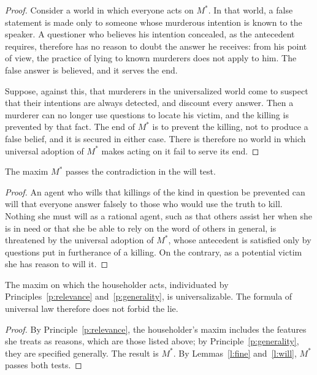 \documentclass{situationist-preprint}
\begin{document}
\begin{proof}
Consider a world in which everyone acts on $M^\ast$. In that world, a false statement is made only to someone whose murderous intention is known to the speaker. A questioner who believes his intention concealed, as the antecedent requires, therefore has no reason to doubt the answer he receives: from his point of view, the practice of lying to known murderers does not apply to him. The false answer is believed, and it serves the end.

Suppose, against this, that murderers in the universalized world come to suspect that their intentions are always detected, and discount every answer. Then a murderer can no longer use questions to locate his victim, and the killing is prevented by that fact. The end of $M^\ast$ is to prevent the killing, not to produce a false belief, and it is secured in either case. There is therefore no world in which universal adoption of $M^\ast$ makes acting on it fail to serve its end.
\end{proof}

\begin{lemma}\label{l:will}
The maxim $M^\ast$ passes the contradiction in the will test.
\end{lemma}

\begin{proof}
An agent who wills that killings of the kind in question be prevented can will that everyone answer falsely to those who would use the truth to kill. Nothing she must will as a rational agent, such as that others assist her when she is in need or that she be able to rely on the word of others in general, is threatened by the universal adoption of $M^\ast$, whose antecedent is satisfied only by questions put in furtherance of a killing. On the contrary, as a potential victim she has reason to will it.
\end{proof}

\begin{theorem}\label{t:main}
The maxim on which the householder acts, individuated by Principles~\ref{p:relevance} and~\ref{p:generality}, is universalizable. The formula of universal law therefore does not forbid the lie.
\end{theorem}

\begin{proof}
By Principle~\ref{p:relevance}, the householder's maxim includes the features she treats as reasons, which are those listed above; by Principle~\ref{p:generality}, they are specified generally. The result is $M^\ast$. By Lemmas~\ref{l:fine} and~\ref{l:will}, $M^\ast$ passes both tests.
\end{proof}
\end{document}
